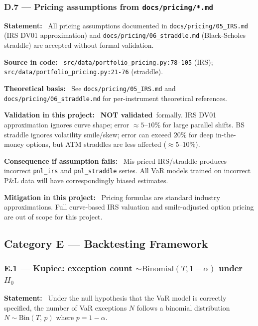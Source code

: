 \documentclass[11pt,a4paper]{article}
\newcommand{\asmfield}[1]{\medskip\noindent\textbf{#1:}\ }
\newcommand{\code}[1]{\texttt{#1}}
\newcommand{\notvalidated}{\textbf{NOT validated}}
\begin{document}
\subsubsection{D.7 --- Pricing assumptions from \texttt{docs/pricing/*.md}}\label{asm:D7}

\asmfield{Statement}
All pricing assumptions documented in \code{docs/pricing/05\_IRS.md} (IRS
DV01 approximation) and \code{docs/pricing/06\_straddle.md} (Black-Scholes
straddle) are accepted without formal validation.

\asmfield{Source in code}
\code{src/data/portfolio\_pricing.py:78-105} (IRS);
\code{src/data/portfolio\_pricing.py:21-76} (straddle).

\asmfield{Theoretical basis}
See \code{docs/pricing/05\_IRS.md} and \code{docs/pricing/06\_straddle.md}
for per-instrument theoretical references.

\asmfield{Validation in this project}
\notvalidated\ formally. IRS DV01 approximation ignores curve shape;
error $\approx 5$--$10\%$ for large parallel shifts. BS straddle ignores
volatility smile/skew; error can exceed $20\%$ for deep in-the-money options,
but ATM straddles are less affected ($\approx 5$--$10\%$).

\asmfield{Consequence if assumption fails}
Mis-priced IRS/straddle produces incorrect \code{pnl\_irs} and
\code{pnl\_straddle} series. All VaR models trained on incorrect P\&L data
will have correspondingly biased estimates.

\asmfield{Mitigation in this project}
Pricing formulas are standard industry approximations. Full curve-based IRS
valuation and smile-adjusted option pricing are out of scope for this project.

\subsection{Category E --- Backtesting Framework}\label{sec:catE}

\subsubsection{E.1 --- Kupiec: exception count $\sim \mathrm{Binomial}(T, 1-\alpha)$ under $H_0$}\label{asm:E1}

\asmfield{Statement}
Under the null hypothesis that the VaR model is correctly specified,
the number of VaR exceptions $N$ follows a binomial distribution
$N \sim \mathrm{Bin}(T,\, p)$ where $p = 1 - \alpha$.
\end{document}
